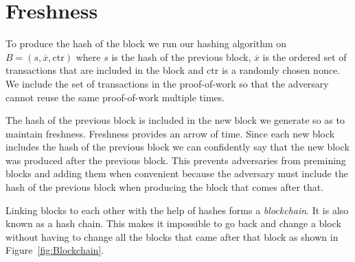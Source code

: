 \section{Freshness}
To produce the hash of the block we run our hashing algorithm on $B = (s,\overline{x}, \mathrm{ctr})$ where
$s$ is the hash of the previous block, $\overline{x}$ is the ordered set of transactions that are included in the block and $\mathrm{ctr}$ is a randomly chosen nonce. We include the set of transactions in the proof-of-work so that the adversary cannot reuse the same proof-of-work multiple times.

The hash of the previous block is included in the new block we generate so as to maintain freshness. Freshness provides an arrow of time. Since each new block includes the hash of the previous block we can confidently say that the new block was produced after the previous block. This prevents adversaries from premining blocks and adding them when convenient because the adversary must include the hash of the previous block when producing the block that comes after that.

Linking blocks to each other with the help of hashes forms a \textit{blockchain}. It is also known as a hash chain.
This makes it impossible to go back and change a block without having to change all the blocks that came after that block as shown in Figure~\ref{fig:Blockchain}.

